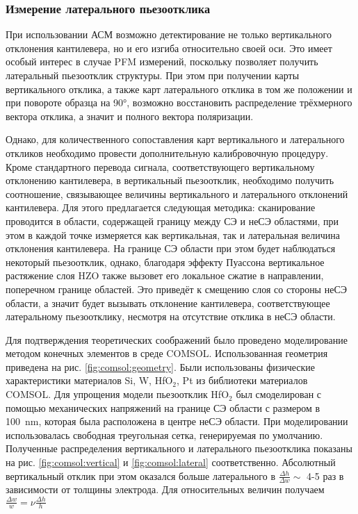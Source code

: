 \subsubsection{Измерение латерального пьезоотклика}
При использовании АСМ возможно детектирование не только вертикального отклонения кантилевера, но и его изгиба относительно своей оси. Это имеет особый интерес в случае PFM измерений, поскольку позволяет получить латеральный пьезоотклик структуры. При этом при получении карты вертикального отклика, а также карт латерального отклика в том же положении и при повороте образца на \ang{90}, возможно восстановить распределение трёхмерного вектора отклика, а значит и полного вектора поляризации.

Однако, для количественного сопоставления карт вертикального и латерального откликов необходимо провести дополнительную калибровочную процедуру. Кроме стандартного перевода сигнала, соответствующего вертикальному отклонению кантилевера, в вертикальный пьезоотклик, необходимо получить соотношение, связывающее величины вертикального и латерального отклонений кантилевера. Для этого предлагается следующая методика: сканирование проводится в области, содержащей границу между СЭ и неСЭ областями, при этом в каждой точке измеряется как вертикальная, так и латеральная величина отклонения кантилевера. На границе СЭ области при этом будет наблюдаться некоторый пьезоотклик, однако, благодаря эффекту Пуассона вертикальное растяжение слоя HZO также вызовет его локальное сжатие в направлении, поперечном границе областей. Это приведёт к смещению слоя со стороны неСЭ области, а значит будет вызывать отклонение кантилевера, соответствующее латеральному пьезоотклику, несмотря на отсутствие отклика в неСЭ области.

Для подтверждения теоретических соображений было проведено моделирование методом конечных элементов в среде COMSOL. Использованная геометрия приведена на рис. \cref{fig:comsol:geometry}. Были использованы физические характеристики материалов Si, W, HfO\(_2\), Pt из библиотеки материалов COMSOL. Для упрощения модели пьезоотклик HfO\(_2\) был смоделирован с помощью механических напряжений на границе СЭ области с размером в \SI{100}{\nano\meter}, которая была расположена в центре неСЭ области. При моделировании использовалась свободная треугольная сетка, генерируемая по умолчанию. Полученные распределения вертикального и латерального пьезоотклика показаны на рис. \cref{fig:comsol:vertical} и \cref{fig:comsol:lateral} соответственно. Абсолютный вертикальный отклик при этом оказался больше латерального в \(\frac{\Delta h}{\Delta w}\sim\) 4-5 раз в зависимости от толщины электрода. Для относительных величин получаем \(\frac{\Delta w}{w} = \nu \frac{\Delta h}{h}\)

